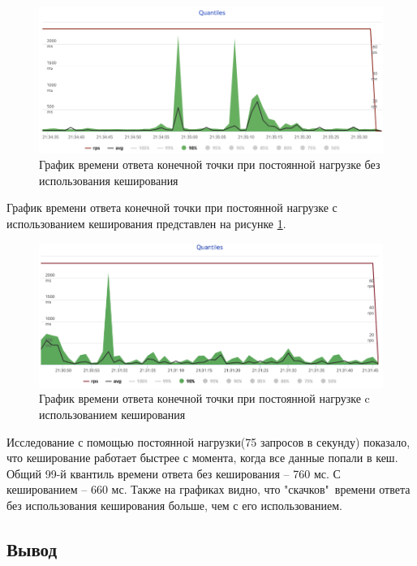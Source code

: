 \begin{figure}[hbtp]
	\centering
	\includegraphics[width=\textwidth]{img/bench-post-no-cache}
	\caption{График времени ответа конечной точки при постоянной нагрузке без использования кеширования}
	\label{fig:post-bench-no-cache}
\end{figure}

\newpage

График  времени ответа конечной точки при постоянной
нагрузке с использованием кеширования представлен на рисунке \ref{fig:post-bench-no-cache}.

\begin{figure}[hbtp]
	\centering
	\includegraphics[width=\textwidth]{img/bench-post-cache}
	\caption{График времени ответа конечной точки при постоянной нагрузке c использованием кеширования}
	\label{fig:post-bench-cache}
\end{figure}

Исследование с помощью постоянной нагрузки(75 запросов в секунду) показало, что кеширование работает быстрее с момента, когда все данные попали в кеш. Общий 99-й квантиль времени ответа без кеширования -- 760 мс. С кешированием -- 660 мс. Также на графиках видно, что "скачков"\ времени ответа без использования кеширования больше, чем с его использованием.

\subsection*{Вывод}

